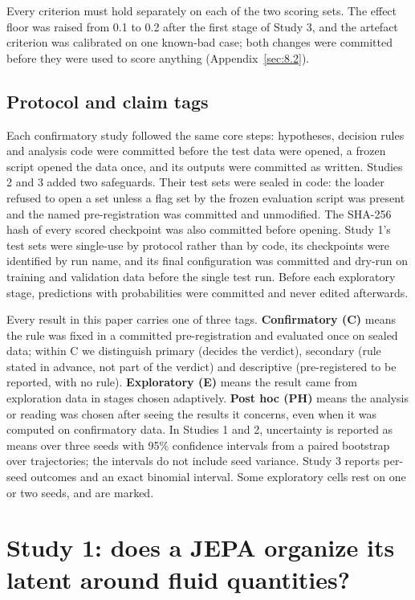 \documentclass[10pt]{article}
\begin{document}
Every criterion must hold separately on each of the two scoring sets. The effect floor was raised from 0.1 to 0.2 after the first stage of Study 3, and the artefact criterion was calibrated on one known-bad case; both changes were committed before they were used to score anything (Appendix~\ref{sec:8.2}).

\subsection{Protocol and claim tags}\label{sec:3.4}

Each confirmatory study followed the same core steps: hypotheses, decision rules and analysis code were committed before the test data were opened, a frozen script opened the data once, and its outputs were committed as written. Studies 2 and 3 added two safeguards. Their test sets were sealed in code: the loader refused to open a set unless a flag set by the frozen evaluation script was present and the named pre-registration was committed and unmodified. The SHA-256 hash of every scored checkpoint was also committed before opening. Study 1's test sets were single-use by protocol rather than by code, its checkpoints were identified by run name, and its final configuration was committed and dry-run on training and validation data before the single test run. Before each exploratory stage, predictions with probabilities were committed and never edited afterwards.

Every result in this paper carries one of three tags. \textbf{Confirmatory (C)} means the rule was fixed in a committed pre-registration and evaluated once on sealed data; within C we distinguish primary (decides the verdict), secondary (rule stated in advance, not part of the verdict) and descriptive (pre-registered to be reported, with no rule). \textbf{Exploratory (E)} means the result came from exploration data in stages chosen adaptively. \textbf{Post hoc (PH)} means the analysis or reading was chosen after seeing the results it concerns, even when it was computed on confirmatory data. In Studies 1 and 2, uncertainty is reported as means over three seeds with 95\% confidence intervals from a paired bootstrap over trajectories; the intervals do not include seed variance. Study 3 reports per-seed outcomes and an exact binomial interval. Some exploratory cells rest on one or two seeds, and are marked.

\section{Study 1: does a JEPA organize its latent around fluid quantities?}\label{sec:4}
\end{document}

